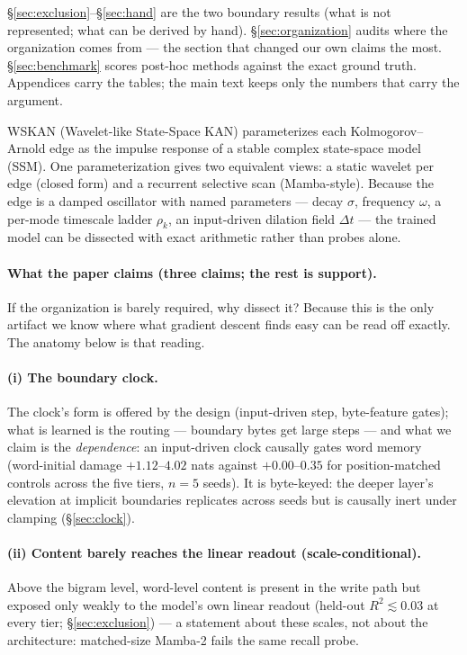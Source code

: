 \documentclass[11pt]{article}
\newcommand{\wskan}{WSKAN}
\newcommand{\Dt}{\Delta t}
\begin{document}
\S\ref{sec:exclusion}--\S\ref{sec:hand} are the two
boundary results (what is not represented; what can be derived by hand).
\S\ref{sec:organization} audits where the organization comes from ---
the section that changed our own claims the most. \S\ref{sec:benchmark}
scores post-hoc methods against the exact ground truth. Appendices carry
the tables; the main text keeps only the numbers that carry the argument.

\wskan{} (Wavelet-like State-Space KAN) parameterizes each Kolmogorov--Arnold edge as
the impulse response of a stable complex state-space model (SSM). One
parameterization gives two equivalent views: a static wavelet per edge
(closed form) and a recurrent selective scan (Mamba-style). Because the
edge is a damped oscillator with named parameters --- decay $\sigma$,
frequency $\omega$, a per-mode timescale ladder $\rho_k$, an input-driven
dilation field $\Dt$ --- the trained model can be dissected with exact
arithmetic rather than probes alone.

\paragraph{What the paper claims (three claims; the rest is support).}
If the organization is barely required, why dissect it? Because this is
the only artifact we know where what gradient descent finds easy can be
read off exactly. The anatomy below is that reading.

\paragraph{(i) The boundary clock.} The clock's form is offered by the
design (input-driven step, byte-feature gates); what is learned is the
routing --- boundary bytes get large steps --- and what we claim is the
\emph{dependence}: an input-driven clock causally gates word memory
(word-initial damage $+1.12$--$4.02$ nats against $+0.00$--$0.35$ for
position-matched controls across the five tiers, $n=5$ seeds). It is
byte-keyed: the deeper layer's elevation at implicit boundaries
replicates across seeds but is causally inert under clamping
(\S\ref{sec:clock}).

\paragraph{(ii) Content barely reaches the linear readout
(scale-conditional).} Above the
bigram level, word-level content is present in the write path but exposed
only weakly to the model's own linear readout (held-out $R^2 \lesssim 0.03$ at
every tier; \S\ref{sec:exclusion}) --- a statement about these scales, not
about the architecture: matched-size Mamba-2 fails the same recall probe.
\end{document}
